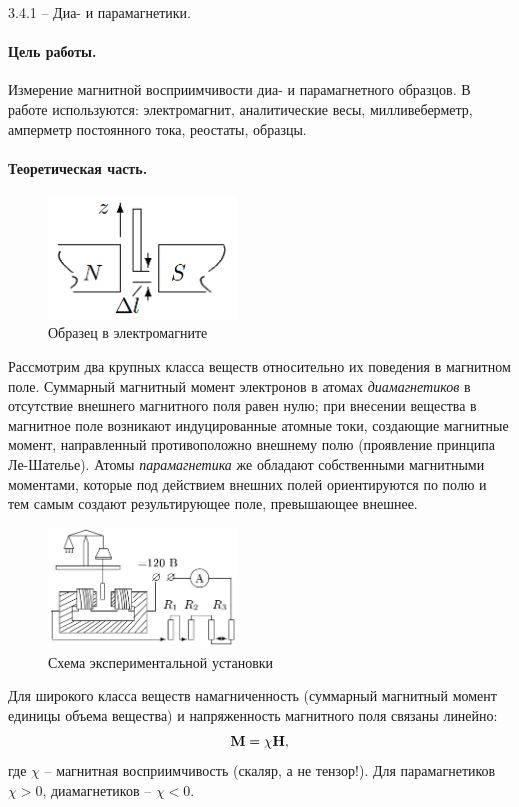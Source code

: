 \documentclass{../lab_class}
\begin{document}
{\Large 3.4.1 -- Диа- и парамагнетики.}

\paragraph{Цель работы.}
Измерение магнитной восприимчивости диа- и парамагнетного образцов.
В работе используются: электромагнит, аналитические весы, милливеберметр, амперметр постоянного тока, реостаты, образцы.

\paragraph{Теоретическая часть.}

\begin{figure}
\centering
\includegraphics[width=5cm]{electromagnet.png}
\caption{Образец в электромагните}
\end{figure}

Рассмотрим два крупных класса веществ относительно их поведения в магнитном поле. Суммарный магнитный момент электронов в атомах \emph{диамагнетиков} в отсутствие внешнего магнитного поля равен нулю; при внесении вещества в магнитное поле возникают индуцированные атомные токи, создающие магнитные момент, направленный противоположно внешнему полю (проявление принципа Ле-Шателье). Атомы \emph{парамагнетика} же обладают собственными магнитными моментами, которые под действием внешних полей ориентируются по полю и тем самым создают результирующее поле, превышающее внешнее.

\begin{figure}
\centering
\includegraphics[width=5cm]{lab_scheme.png}
\caption{Схема экспериментальной установки}
\end{figure}

Для широкого класса веществ намагниченность (суммарный магнитный момент единицы объема вещества) и напряженность магнитного поля связаны линейно:
\begin{equation}
	\vb{M} = \chi \vb{H},
\end{equation}
где $\chi$ -- магнитная восприимчивость (скаляр, а не тензор!). Для парамагнетиков $\chi > 0$, диамагнетиков -- $\chi < 0$.
\end{document}
